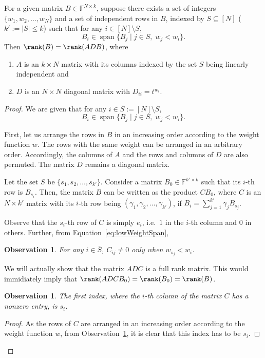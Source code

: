\documentclass[final,oneeqnum, onethmnum, onefignum]{siamltex1213}
\newcommand{\F}{\mathbb F}
\newcommand{\abs}[1]{\lvert #1 \rvert}
\DeclareMathOperator{\Span}{span}
\renewcommand{\o}[1]{\overline{#1}}
\newtheorem{observation}[theorem]{Observation}
\begin{document}
{\begin{lemma}
\label{lem:rankExtractor}
For a given matrix $B \in \F^{N \times k}$, suppose there exists
a set of integers $\{w_1, w_2, \dots, w_N\}$ 
and a set of independent rows in $B$, indexed by $S \subseteq [N]$ ($k' := \abs{S} \leq k$)
such that for any $i \in [N] \setminus S$, 
$$ B_i \in \Span \{B_j \mid j \in S, \; w_j < w_i \}.$$
Then $\rank(B) = \rank(ADB)$, where
\begin{enumerate}
\item $A$ is an $k \times N$ matrix with  its columns indexed by the set $S$ being linearly independent and 
\item $D$ is an $N \times N$ diagonal matrix with $D_{ii} = t^{w_i}$.
\end{enumerate}
\end{lemma}

\begin{proof}
We are given that for any $i \in \o{S} := [N] \setminus S$, 
\begin{equation} 
B_i \in \Span \{B_j \mid j \in S, \; w_j < w_i \}.
\label{eq:lowWeightSpan}
\end{equation}

First, let us arrange the rows in $B$ in an increasing order according
to the weight function $w$.
The rows with the same weight can be arranged in an arbitrary order.
Accordingly, the columns of $A$ and the rows and columns of $D$ are also permuted. The matrix $D$ remains a diagonal matrix. 

Let the set $S$ be $\{s_1, s_2, \dots, s_{k'} \}$.
Consider a matrix $B_0 \in \F^{k' \times k}$ such that
its $i$-{th} row is $B_{s_i}$.
Then, the matrix $B$ can be written as the product $C B_0$,
where $C$ is an $N \times k'$ matrix with its $i$-th row being 
$(\gamma_1, \gamma_2, \dots, \gamma_{k'})$, if 
$B_i = \sum_{j=1}^{k'} \gamma_j B_{s_j}$.

Observe that the $s_i$-th row of $C$ is simply $e_i$, i.e.\ $1$ in the $i$-th column and $0$ in others. 
Further,
from Equation~\ref{eq:lowWeightSpan},
\begin{observation}
\label{obs:nonzero}
For any $i \in \o{S}$, $C_{ij} \neq 0$ only when $w_{s_j} < w_i$.
\end{observation}

We will actually show that the matrix $ADC$ is a full rank matrix.
This would immidiately imply that $\rank(ADCB_0) = \rank(B_0) = \rank(B)$.

\begin{observation}
\label{obs:colMin}
The first index, where the $i$-th column of the matrix $C$
has a nonzero entry, is $s_i$.
\end{observation}
\begin{proof}
As the rows of $C$ are arranged in an increasing order according to
the weight function $w$,
from Observation~\ref{obs:nonzero}, it is clear that 
 this index has to be $s_i$.
\end{proof}


\end{proof}}
\end{document}
